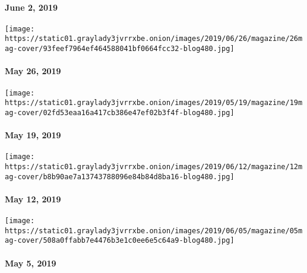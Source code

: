 \hypertarget{june-2-2019}{%
\paragraph{June 2, 2019}\label{june-2-2019}}

\href{https://www.nytimes3xbfgragh.onion/issue/magazine/2019/06/06/the-52619-issue}{}

\texttt{[image: https://static01.graylady3jvrrxbe.onion/images/2019/06/26/magazine/26mag-cover/93feef7964ef464588041bf0664fcc32-blog480.jpg]}

\hypertarget{may-26-2019}{%
\paragraph{May 26, 2019}\label{may-26-2019}}

\href{https://www.nytimes3xbfgragh.onion/issue/magazine/2019/05/17/the-51919-issue}{}

\texttt{[image: https://static01.graylady3jvrrxbe.onion/images/2019/05/19/magazine/19mag-cover/02fd53eaa16a417cb386e47ef02b3f4f-blog480.jpg]}

\hypertarget{may-19-2019}{%
\paragraph{May 19, 2019}\label{may-19-2019}}

\href{https://www.nytimes3xbfgragh.onion/issue/magazine/2019/05/17/the-51219-issue}{}

\texttt{[image: https://static01.graylady3jvrrxbe.onion/images/2019/06/12/magazine/12mag-cover/b8b90ae7a13743788096e84b84d8ba16-blog480.jpg]}

\hypertarget{may-12-2019}{%
\paragraph{May 12, 2019}\label{may-12-2019}}

\href{https://www.nytimes3xbfgragh.onion/issue/magazine/2019/05/17/the-5519-issue}{}

\texttt{[image: https://static01.graylady3jvrrxbe.onion/images/2019/06/05/magazine/05mag-cover/508a0ffabb7e4476b3e1c0ee6e5c64a9-blog480.jpg]}

\hypertarget{may-5-2019}{%
\paragraph{May 5, 2019}\label{may-5-2019}}

